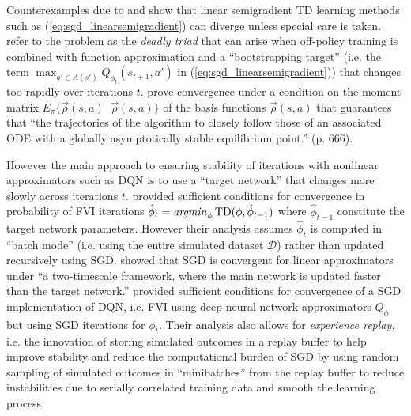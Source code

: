 Counterexamples due to \citet{Baird:1995} and \citet{TsitsiklisVanRoy:1997} show that linear semigradient TD learning methods
such as (\ref{eq:sgd_linearsemigradient}) can diverge unless special care is taken. \citet{BartoSutton:2020} refer to the problem
as the  {\it deadly triad\/}  that can arise when off-policy training is combined with function approximation
and a  ``bootstrapping target'' (i.e. the 
term  $\max_{a' \in A(s')} Q_{\phi_t}(s_{t+1},a')$ in (\ref{eq:sgd_linearsemigradient})) that
changes too rapidly over iterations $t$. \citet{melo:2008} prove convergence under  
a condition on the moment matrix $E_\pi\{\vec{\rho}(s,a)^{\top}\vec{\rho}(s,a)\}$ of the basis functions
$\vec{\rho}(s,a)$ that guarantees that ``the trajectories of the algorithm to closely follow those of an associated
ODE with a globally asymptotically stable equilibrium point.'' (p. 666). 

However the main approach to ensuring stability of iterations with nonlinear approximators such as DQN is to use a ``target network''
that changes more slowly across iterations $t$.  \citet{antos:2008} provided sufficient conditions for convergence in probability 
of FVI iterations $\hat\phi_t =\mathop{\it argmin}_\phi \mbox{TD}(\phi,\hat\phi_{t-1})$ where $\hat\phi_{t-1}$
constitute the target network parameters. However their analysis assumes  $\hat\phi_t$ is computed
in ``batch mode'' (i.e. using the entire simulated dataset $\mathcal{D}$) rather than updated recursively using
SGD.  \citet{zhang:2019} showed that SGD is convergent for linear approximators under ``a two-timescale framework, where the
main network is updated faster than the target network.'' \citet{Zhang:2023} provided sufficient conditions for
convergence of a SGD implementation of DQN, i.e. FVI using deep neural network  approximators $Q_\phi$ but using 
SGD iterations for $\phi_t$. Their analysis also 
allows for {\it experience replay,\/} i.e. the innovation of storing simulated outcomes in a replay buffer to help improve
stability and reduce the computational burden of SGD by using random sampling of simulated outcomes in ``minibatches'' 
from the replay buffer to reduce instabilities due to serially correlated training data and  smooth the learning process.

